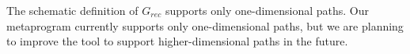 \documentclass[runningheads]{llncs}
\begin{document}
The schematic definition of $G_{\mathit{rec}}$ supports only one-dimensional paths.
Our metaprogram currently supports only one-dimensional paths, but we are planning to improve the tool to support higher-dimensional paths in the future. 
\end{document}
